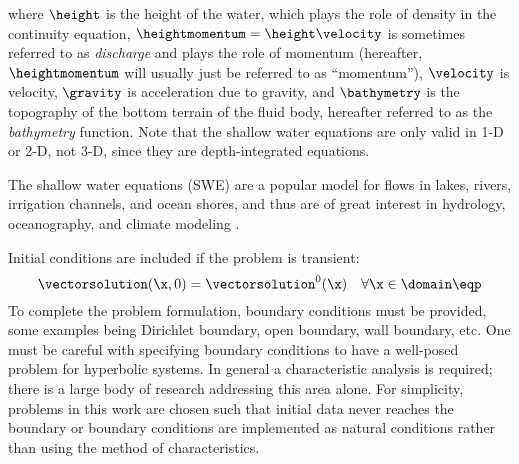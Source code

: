where $\height$ is the height of the water, which plays the role of density
in the continuity equation, $\heightmomentum=\height\velocity$ is sometimes
referred to as \emph{discharge} and plays the role of momentum (hereafter,
$\heightmomentum$ will usually just be referred to as ``momentum''),
$\velocity$ is velocity, $\gravity$
is acceleration due to gravity, and $\bathymetry$ is the topography of the
bottom terrain of the fluid body, hereafter referred to as the \emph{bathymetry}
function.
Note that the shallow water equations are only valid in 1-D or 2-D, not 3-D,
since they are depth-integrated equations.

The shallow water equations (SWE) are a popular model for flows in lakes, rivers,
irrigation channels, and ocean shores, and thus are of great interest
in hydrology, oceanography, and climate modeling\cite{bernetti2008}
\cite{fjordholm2011}.

Initial conditions are included if the problem is transient:
\begin{equation}
   \vectorsolution(\x,0) = \vectorsolution^0(\x)
   \quad \forall \x\in\domain \eqp
\end{equation}
To complete the problem formulation, boundary
conditions must be provided, some examples being
Dirichlet boundary, open boundary, wall boundary, etc.
One must be careful with specifying boundary conditions to have
a well-posed problem for hyperbolic systems.
In general a characteristic analysis is required; there is a large body of research
addressing this area alone. For simplicity, problems in this work are
chosen such that initial data never reaches the boundary
or boundary conditions are implemented as natural conditions
rather than using the method of characteristics.

